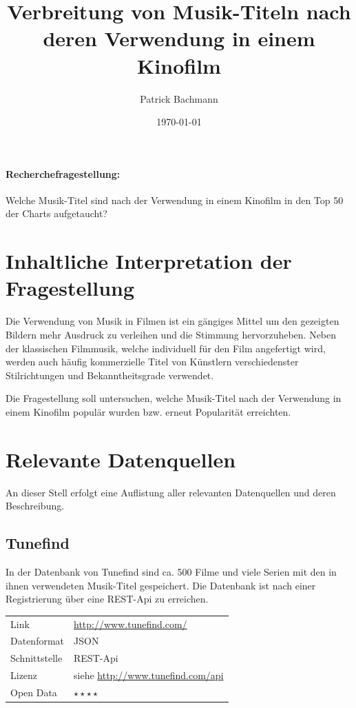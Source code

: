 \documentclass[parskip]{scrartcl}
\begin{document}
\subject{Projektdokumentation im Modul Semantic Web}
\title{Verbreitung von Musik-Titeln nach deren Verwendung in einem Kinofilm}
\author{Patrick Bachmann}
\date{\today}

\maketitle


\paragraph{Recherchefragestellung: }
Welche Musik-Titel sind nach der Verwendung in einem Kinofilm in den Top 50 der Charts aufgetaucht?


\section{Inhaltliche Interpretation der Fragestellung}

Die Verwendung von Musik in Filmen ist ein gängiges Mittel um den gezeigten Bildern mehr Ausdruck zu verleihen und die Stimmung hervorzuheben. Neben der klassischen Filmmusik, welche individuell für den Film angefertigt wird, werden auch häufig kommerzielle Titel von Künstlern verschiedenster Stilrichtungen und Bekanntheitsgrade verwendet.

Die Fragestellung soll untersuchen, welche Musik-Titel nach der Verwendung in einem Kinofilm populär wurden bzw. erneut Popularität erreichten.


\section{Relevante Datenquellen}

An dieser Stell erfolgt eine Auflistung aller relevanten Datenquellen und deren Beschreibung.

\subsection{Tunefind}
\label{subsec:tunefind}

In der Datenbank von Tunefind sind ca. 500 Filme und viele Serien mit den in ihnen verwendeten Musik-Titel gespeichert. Die Datenbank ist nach einer Registrierung über eine REST-Api zu erreichen.

\begin{tabular}{l|p{9cm}}
	Link & \url{http://www.tunefind.com/} \\
 	Datenformat & JSON \\
 	Schnittstelle & REST-Api \\
 	Lizenz & siehe \url{http://www.tunefind.com/api} \\
 	Open Data & $\star\star\star\star$ \\
\end{tabular}
\end{document}
